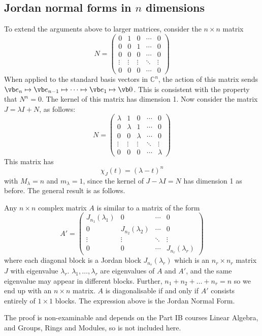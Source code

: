 \subsection{Jordan normal forms in \(n\) dimensions}
To extend the arguments above to larger matrices, consider the \(n\times n\) matrix
\[
	N = \begin{pmatrix}
		0      & 1      & 0      & \cdots & 0      \\
		0      & 0      & 1      & \cdots & 0      \\
		0      & 0      & 0      & \cdots & 0      \\
		\vdots & \vdots & \vdots & \ddots & \vdots \\
		0      & 0      & 0      & \cdots & 0
	\end{pmatrix}
\]
When applied to the standard basis vectors in \(\mathbb C^n\), the action of this matrix sends \(\vb e_n \mapsto \vb e_{n-1} \mapsto \dots \mapsto \vb e_1 \mapsto \vb 0\).
This is consistent with the property that \(N^n = 0\).
The kernel of this matrix has dimension 1.
Now consider the matrix \(J = \lambda I + N\), as follows:
\[
	N = \begin{pmatrix}
		\lambda & 1       & 0       & \cdots & 0       \\
		0       & \lambda & 1       & \cdots & 0       \\
		0       & 0       & \lambda & \cdots & 0       \\
		\vdots  & \vdots  & \vdots  & \ddots & \vdots  \\
		0       & 0       & 0       & \cdots & \lambda
	\end{pmatrix}
\]
This matrix has
\[
	\chi_J(t) = (\lambda - t)^n
\]
with \(M_\lambda = n\) and \(m_\lambda = 1\), since the kernel of \(J - \lambda I = N\) has dimension 1 as before.
The general result is as follows.
\begin{theorem}
	Any \(n\times n\) complex matrix \(A\) is similar to a matrix of the form
	\[
		A' = \left( \begin{array}{c|c|c|c}
				J_{n_1}(\lambda_1) & 0                  & \cdots & 0                  \\\hline
				0                  & J_{n_2}(\lambda_2) & \cdots & 0                  \\\hline
				\vdots             & \vdots             & \ddots & \vdots             \\\hline
				0                  & 0                  & \cdots & J_{n_r}(\lambda_r)
			\end{array} \right)
	\]
	where each diagonal block is a Jordan block \(J_{n_r}(\lambda_r)\) which is an \(n_r \times n_r\) matrix \(J\) with eigenvalue \(\lambda_r\).
	\(\lambda_1, \dots, \lambda_r\) are eigenvalues of \(A\) and \(A'\), and the same eigenvalue may appear in different blocks.
	Further, \(n_1 + n_2 + \dots + n_r = n\) so we end up with an \(n \times n\) matrix.
	\(A\) is diagonalisable if and only if \(A'\) consists entirely of \(1 \times 1\) blocks.
	The expression above is the Jordan Normal Form.
\end{theorem}
The proof is non-examinable and depends on the Part IB courses Linear Algebra, and Groups, Rings and Modules, so is not included here.
